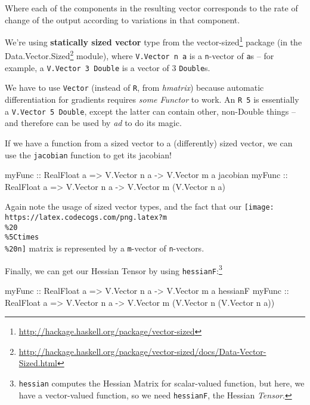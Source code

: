 \documentclass[]{article}
\newenvironment{Shaded}{}{}
\newcommand{\DataTypeTok}[1]{\textcolor[rgb]{0.56,0.13,0.00}{#1}}
\newcommand{\NormalTok}[1]{#1}
\newcommand{\OtherTok}[1]{\textcolor[rgb]{0.00,0.44,0.13}{#1}}
\renewcommand{\href}[2]{#2\footnote{\url{#1}}}
\begin{document}
Where each of the components in the resulting vector corresponds to the rate of
change of the output according to variations in that component.

We're using \textbf{statically sized vector} type from the
\href{http://hackage.haskell.org/package/vector-sized}{vector-sized} package (in
the
\href{http://hackage.haskell.org/package/vector-sized/docs/Data-Vector-Sized.html}{Data.Vector.Sized}
module), where \texttt{V.Vector\ n\ a} is a \texttt{n}-vector of \texttt{a}s --
for example, a \texttt{V.Vector\ 3\ Double} is a vector of 3 \texttt{Double}s.

We have to use \texttt{Vector} (instead of \texttt{R}, from \emph{hmatrix})
because automatic differentiation for gradients requires \emph{some Functor} to
work. An \texttt{R\ 5} is essentially a \texttt{V.Vector\ 5\ Double}, except the
latter can contain other, non-Double things -- and therefore can be used by
\emph{ad} to do its magic.

If we have a function from a sized vector to a (differently) sized vector, we
can use the \texttt{jacobian} function to get its jacobian!

\begin{Shaded}
\begin{Highlighting}[]
\OtherTok{myFunc          ::} \DataTypeTok{RealFloat}\NormalTok{ a }\OtherTok{=>} \DataTypeTok{V.Vector}\NormalTok{ n a }\OtherTok{->} \DataTypeTok{V.Vector}\NormalTok{ m a}
\NormalTok{jacobian}\OtherTok{ myFunc ::} \DataTypeTok{RealFloat}\NormalTok{ a }\OtherTok{=>} \DataTypeTok{V.Vector}\NormalTok{ n a }\OtherTok{->} \DataTypeTok{V.Vector}\NormalTok{ m (}\DataTypeTok{V.Vector}\NormalTok{ n a)}
\end{Highlighting}
\end{Shaded}

Again note the usage of sized vector types, and the fact that our
\texttt{[image: https://latex.codecogs.com/png.latex?m\\\%20\\\%5Ctimes\\\%20n]}
matrix is represented by a \texttt{m}-vector of \texttt{n}-vectors.

Finally, we can get our Hessian Tensor by using \texttt{hessianF}:\footnote{\texttt{hessian}
  computes the Hessian Matrix for scalar-valued function, but here, we have a
  vector-valued function, so we need \texttt{hessianF}, the Hessian
  \emph{Tensor}.}

\begin{Shaded}
\begin{Highlighting}[]
\NormalTok{myFunc}
\OtherTok{    ::} \DataTypeTok{RealFloat}\NormalTok{ a }\OtherTok{=>} \DataTypeTok{V.Vector}\NormalTok{ n a }\OtherTok{->} \DataTypeTok{V.Vector}\NormalTok{ m a}
\NormalTok{hessianF myFunc}
\OtherTok{    ::} \DataTypeTok{RealFloat}\NormalTok{ a }\OtherTok{=>} \DataTypeTok{V.Vector}\NormalTok{ n a }\OtherTok{->} \DataTypeTok{V.Vector}\NormalTok{ m (}\DataTypeTok{V.Vector}\NormalTok{ n (}\DataTypeTok{V.Vector}\NormalTok{ n a))}
\end{Highlighting}
\end{Shaded}
\end{document}
